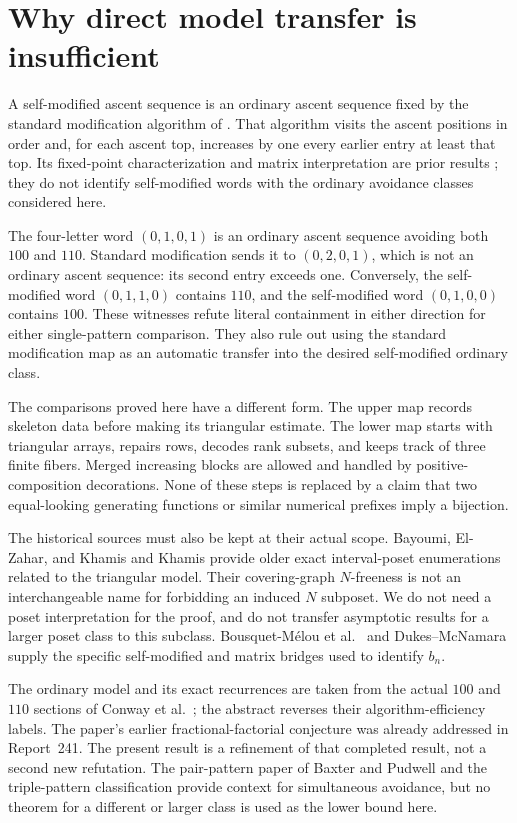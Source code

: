 \section{Why direct model transfer is insufficient}\label{sec:scope}
A self-modified ascent sequence is an ordinary ascent sequence fixed by the standard modification algorithm of \cite[Section~4.1]{bcdk}. That algorithm visits the ascent positions in order and, for each ascent top, increases by one every earlier entry at least that top. Its fixed-point characterization and matrix interpretation are prior results \cite{bcdk,dukes}; they do not identify self-modified words with the ordinary avoidance classes considered here.

The four-letter word $(0,1,0,1)$ is an ordinary ascent sequence avoiding both $100$ and $110$. Standard modification sends it to $(0,2,0,1)$, which is not an ordinary ascent sequence: its second entry exceeds one. Conversely, the self-modified word $(0,1,1,0)$ contains $110$, and the self-modified word $(0,1,0,0)$ contains $100$. These witnesses refute literal containment in either direction for either single-pattern comparison. They also rule out using the standard modification map as an automatic transfer into the desired self-modified ordinary class.

The comparisons proved here have a different form. The upper map records skeleton data before making its triangular estimate. The lower map starts with triangular arrays, repairs rows, decodes rank subsets, and keeps track of three finite fibers. Merged increasing blocks are allowed and handled by positive-composition decorations. None of these steps is replaced by a claim that two equal-looking generating functions or similar numerical prefixes imply a bijection.

The historical sources must also be kept at their actual scope. Bayoumi, El-Zahar, and Khamis \cite{bayoumi} and Khamis \cite{khamis} provide older exact interval-poset enumerations related to the triangular model. Their covering-graph $N$-freeness is not an interchangeable name for forbidding an induced $N$ subposet. We do not need a poset interpretation for the proof, and do not transfer asymptotic results for a larger poset class to this subclass. Bousquet-M\'elou et al.\ \cite{bcdk} and Dukes--McNamara \cite{dukes} supply the specific self-modified and matrix bridges used to identify $b_n$.

The ordinary model and its exact recurrences are taken from the actual $100$ and $110$ sections of Conway et al.\ \cite[Sections~2.3--2.4]{conway}; the abstract reverses their algorithm-efficiency labels. The paper's earlier fractional-factorial conjecture was already addressed in Report~241. The present result is a refinement of that completed result, not a second new refutation. The pair-pattern paper of Baxter and Pudwell \cite{baxter} and the triple-pattern classification \cite{callan} provide context for simultaneous avoidance, but no theorem for a different or larger class is used as the lower bound here.

